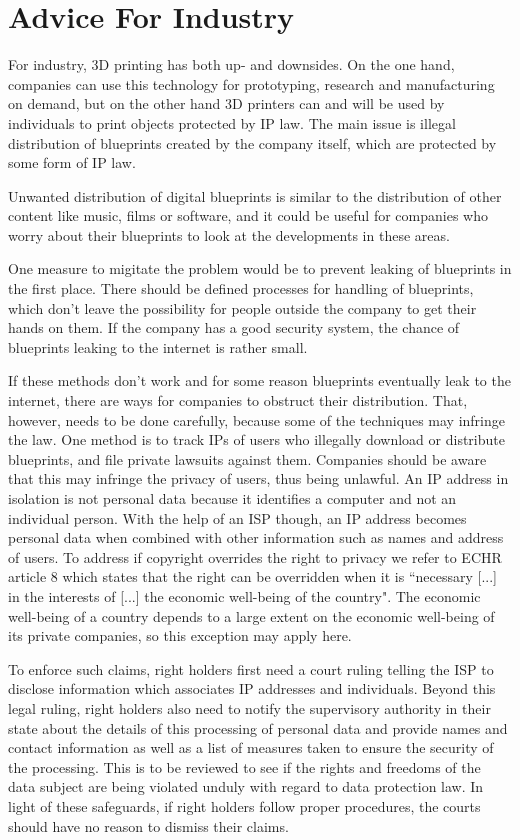 \section{Advice For Industry}
For industry, 3D printing has both up- and downsides.
On the one hand, companies can use this technology for prototyping, research and manufacturing on demand, but on the other hand 3D printers can and will be used by individuals to print objects protected by IP law.
The main issue is illegal distribution of blueprints created by the company itself, which are protected by some form of IP law.

Unwanted distribution of digital blueprints is similar to the distribution of other content like music, films or software, and it could be useful for companies who worry about their blueprints to look at the developments in these areas.

One measure to migitate the problem would be to prevent leaking of blueprints in the first place.
There should be defined processes for handling of blueprints, which don't leave the possibility for people outside the company to get their hands on them.
If the company has a good security system, the chance of blueprints leaking to the internet is rather small.

If these methods don't work and for some reason blueprints eventually leak to the internet, there are ways for companies to obstruct their distribution. That, however, needs to be done carefully, because some of the techniques may infringe the law.
One method is to track IPs of users who illegally download or distribute blueprints, and file private lawsuits against them.
Companies should be aware that this may infringe the privacy of users, thus being unlawful.
An IP address in isolation is not personal data because it identifies a computer and not an individual person.
With the help of an ISP though, an IP address becomes personal data when combined with other information such as names and address of users.
To address if copyright overrides the right to privacy we refer to ECHR article 8 which states that the right can be overridden when it is ``necessary [...] in the interests of [...] the economic well-being of the country".
The economic well-being of a country depends to a large extent on the economic well-being of its private companies, so this exception may apply here.

To enforce such claims, right holders first need a court ruling telling the ISP to disclose information which associates IP addresses and individuals.
Beyond this legal ruling, right holders also need to notify the supervisory authority in their state about the details of this processing of personal data and provide names and contact information as well as a list of measures taken to ensure the security of the processing.
This is to be reviewed to see if the rights and freedoms of the data subject are being violated unduly with regard to data protection law.
In light of these safeguards, if right holders follow proper procedures, the courts should have no reason to dismiss their claims.

